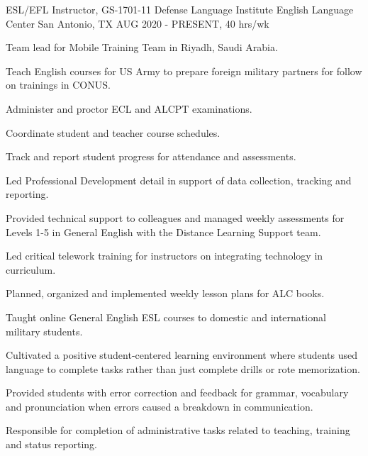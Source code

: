 


\begin{cventries}


\cventry
{ESL/EFL Instructor, GS-1701-11} %
{Defense Language Institute English Language Center} %
{San Antonio, TX} %
{AUG 2020 - PRESENT, 40 hrs/wk} %
{ %
\begin{cvitems}
\item {Team lead for Mobile Training Team in Riyadh, Saudi Arabia.}
\item {Teach English courses for US Army to prepare foreign military partners for follow on trainings in CONUS.}
\item {Administer and proctor ECL and ALCPT examinations.}
\item {Coordinate student and teacher course schedules.}
\item {Track and report student progress for attendance and assessments.}
\item {Led Professional Development detail in support of data collection, tracking and reporting.}
\item {Provided technical support to colleagues and managed weekly assessments for Levels 1-5 in General English with the Distance Learning Support team.}
\item {Led critical telework training for instructors on integrating technology in curriculum.}
\item {Planned, organized and implemented weekly lesson plans for ALC books.}
\item {Taught online General English ESL courses to domestic and international military students.}
\item {Cultivated a positive student-centered learning environment where students used language to complete tasks rather than just complete drills or rote memorization.}
\item {Provided students with error correction and feedback for grammar, vocabulary and pronunciation when errors caused a breakdown in communication.}
\item {Responsible for completion of administrative tasks related to teaching, training and status reporting.} 
\end{cvitems}
}


\end{cventries}
